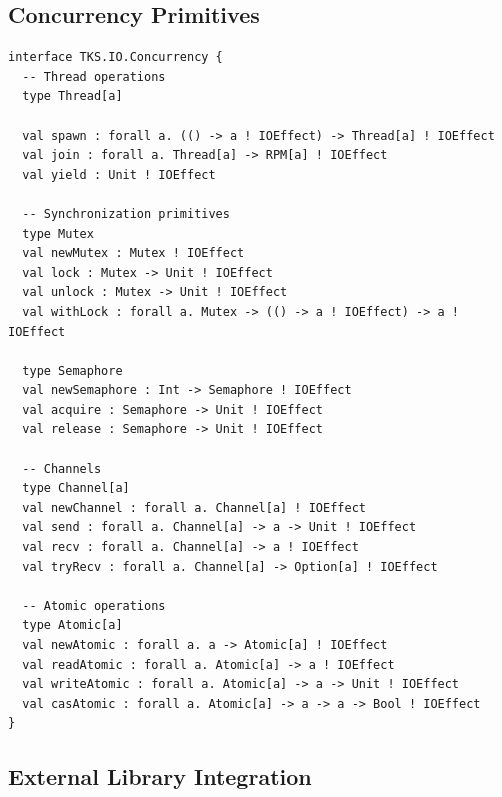 \subsection{Concurrency Primitives}
\label{subsec:concurrency-primitives}

\begin{definition}
\label{def:concurrency-interface}
\begin{verbatim}
interface TKS.IO.Concurrency {
  -- Thread operations
  type Thread[a]

  val spawn : forall a. (() -> a ! IOEffect) -> Thread[a] ! IOEffect
  val join : forall a. Thread[a] -> RPM[a] ! IOEffect
  val yield : Unit ! IOEffect

  -- Synchronization primitives
  type Mutex
  val newMutex : Mutex ! IOEffect
  val lock : Mutex -> Unit ! IOEffect
  val unlock : Mutex -> Unit ! IOEffect
  val withLock : forall a. Mutex -> (() -> a ! IOEffect) -> a ! IOEffect

  type Semaphore
  val newSemaphore : Int -> Semaphore ! IOEffect
  val acquire : Semaphore -> Unit ! IOEffect
  val release : Semaphore -> Unit ! IOEffect

  -- Channels
  type Channel[a]
  val newChannel : forall a. Channel[a] ! IOEffect
  val send : forall a. Channel[a] -> a -> Unit ! IOEffect
  val recv : forall a. Channel[a] -> a ! IOEffect
  val tryRecv : forall a. Channel[a] -> Option[a] ! IOEffect

  -- Atomic operations
  type Atomic[a]
  val newAtomic : forall a. a -> Atomic[a] ! IOEffect
  val readAtomic : forall a. Atomic[a] -> a ! IOEffect
  val writeAtomic : forall a. Atomic[a] -> a -> Unit ! IOEffect
  val casAtomic : forall a. Atomic[a] -> a -> a -> Bool ! IOEffect
}
\end{verbatim}
\end{definition}

\subsection{External Library Integration}
\label{subsec:external-libs}

